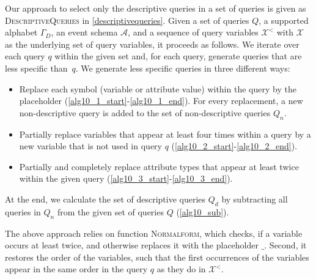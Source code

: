 Our approach to select only the descriptive queries in a set of queries is
given as \textsc{DescriptiveQueries} in \autoref{descriptivequeries}. Given
a set of queries $Q$, a supported alphabet
$\Gamma_D$, an event schema $\mathcal{A}$, and a sequence of query variables
$\mathcal{X}^<$ with $\mathcal{X}$ as the underlying set of query variables,
it proceeds as follows. We iterate over each
query $q$ within the given set and, for each query, generate queries that
are less specific than~$q$.
We generate less specific queries in three different ways:
\begin{itemize}
\item Replace each symbol (variable or attribute value) within the query by
the placeholder (\autoref{alg10_1_start}-\ref{alg10_1_end}). For every
replacement, a new non-descriptive query is added
to the set of non-descriptive queries $Q_n$.
\item Partially replace variables that appear at least four times within a
query by a new variable that is not used in query $q$
(\autoref{alg10_2_start}-\ref{alg10_2_end}).
\item Partially and completely replace attribute types that appear at least
twice within the given query  (\autoref{alg10_3_start}-\ref{alg10_3_end}).
\end{itemize}
At the end, we calculate the set of descriptive queries $Q_d$ by subtracting
all queries in $Q_n$ from the given set of queries $Q$ (\autoref{alg10_sub}).

The above approach relies on function \textsc{Normalform}, which checks, if
a variable occurs
at least twice, and otherwise replaces it with the placeholder $\_$. Second,
it restores the order of the variables, such that the first occurrences of
the variables appear in the same order in the query $q$ as they do in
$\mathcal{X}^<$.

